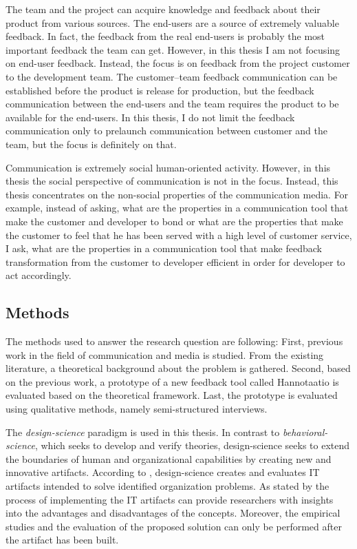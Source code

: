 \documentclass[english,12pt,a4paper,pdftex]{article}
\begin{document}
The team and the project can acquire knowledge and feedback about their product from various sources. The end-users are a source of extremely valuable feedback. In fact, the feedback from the real end-users is probably the most important feedback the team can get. However, in this thesis I am not focusing on end-user feedback. Instead, the focus is on feedback from the project customer to the development team. The customer--team feedback communication can be established before the product is release for production, but the feedback communication between the end-users and the team requires the product to be available for the end-users. In this thesis, I do not limit the feedback communication only to prelaunch communication between customer and the team, but the focus is definitely on that.

Communication is extremely social human-oriented activity. However, in this thesis the social perspective of communication is not in the focus. Instead, this thesis concentrates on the non-social properties of the communication media. For example, instead of asking, what are the properties in a communication tool that make the customer and developer to bond or what are the properties that make the customer to feel that he has been served with a high level of customer service, I ask, what are the properties in a communication tool that make feedback transformation from the customer to developer efficient in order for developer to act accordingly.

\subsection{Methods}

The methods used to answer the research question are following: First, previous work in the field of communication and media is studied. From the existing literature, a theoretical background about the problem is gathered. Second, based on the previous work, a prototype of a new feedback tool called Hannotaatio is evaluated based on the theoretical framework. Last, the prototype is evaluated using qualitative methods, namely semi-structured interviews.

The \emph{design-science} paradigm is used in this thesis. In contrast to \emph{behavioral-science}, which seeks to develop and verify theories, design-science seeks to extend the boundaries of human and organizational capabilities by creating new and innovative artifacts. According to \citet{hevner2004}, design-science creates and evaluates IT artifacts intended to solve identified organization problems. As stated by \citep{nunamaker1990} the process of implementing the IT artifacts can provide researchers with insights into the advantages and disadvantages of the concepts. Moreover, the empirical studies and the evaluation of the proposed solution can only be performed after the artifact has been built.
\end{document}
